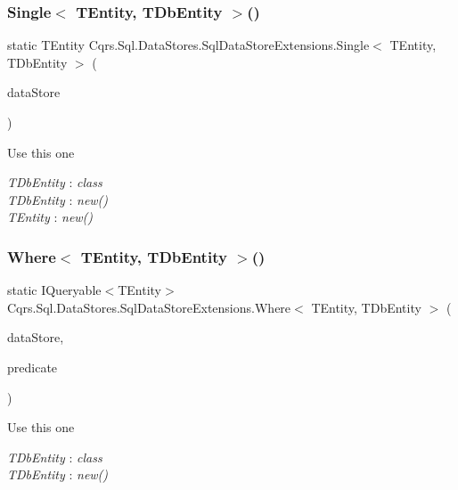 \subsubsection{\texorpdfstring{Single$<$ T\+Entity, T\+Db\+Entity $>$()}{Single< TEntity, TDbEntity >()}}
{\footnotesize\ttfamily static T\+Entity Cqrs.\+Sql.\+Data\+Stores.\+Sql\+Data\+Store\+Extensions.\+Single$<$ T\+Entity, T\+Db\+Entity $>$ (\begin{DoxyParamCaption}\item[{this I\+Enumerable$<$ T\+Entity $>$}]{data\+Store }\end{DoxyParamCaption})\hspace{0.3cm}{\ttfamily [static]}}



Use this one 

\begin{Desc}
\item[Type Constraints]\begin{description}
\item[{\em T\+Db\+Entity} : {\em class}]\item[{\em T\+Db\+Entity} : {\em new()}]\item[{\em T\+Entity} : {\em new()}]\end{description}
\end{Desc}
\mbox{\label{classCqrs_1_1Sql_1_1DataStores_1_1SqlDataStoreExtensions_a77e339885a9e26ff6bcf5b5bbe24b19d_a77e339885a9e26ff6bcf5b5bbe24b19d}} 
\subsubsection{\texorpdfstring{Where$<$ T\+Entity, T\+Db\+Entity $>$()}{Where< TEntity, TDbEntity >()}}
{\footnotesize\ttfamily static I\+Queryable$<$T\+Entity$>$ Cqrs.\+Sql.\+Data\+Stores.\+Sql\+Data\+Store\+Extensions.\+Where$<$ T\+Entity, T\+Db\+Entity $>$ (\begin{DoxyParamCaption}\item[{this \hyperlink{interfaceCqrs_1_1DataStores_1_1IDataStore}{I\+Data\+Store}$<$ T\+Entity $>$}]{data\+Store,  }\item[{Expression$<$ Func$<$ T\+Entity, bool $>$$>$}]{predicate }\end{DoxyParamCaption})\hspace{0.3cm}{\ttfamily [static]}}



Use this one 

\begin{Desc}
\item[Type Constraints]\begin{description}
\item[{\em T\+Db\+Entity} : {\em class}]\item[{\em T\+Db\+Entity} : {\em new()}]\end{description}
\end{Desc}
